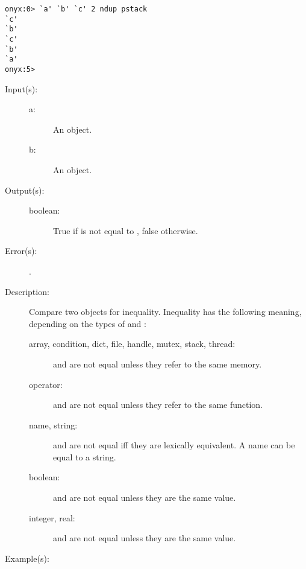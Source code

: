 \begin{description}
\begin{description}
\begin{verbatim}
onyx:0> `a' `b' `c' 2 ndup pstack
`c'
`b'
`c'
`b'
`a'
onyx:5>
		\end{verbatim}
	\end{description}
\label{systemdict:ne}
\item[{\onyxop{a b}{ne}{boolean}}: ]
	\begin{description}\item[]
	\item[Input(s): ]
		\begin{description}\item[]
		\item[a: ]
			An object.
		\item[b: ]
			An object.
		\end{description}
	\item[Output(s): ]
		\begin{description}\item[]
		\item[boolean: ]
			True if  is not equal to , false
			otherwise.
		\end{description}
	\item[Error(s): ]
		\begin{description}\item[]
		\item[.]
		\end{description}
	\item[Description: ]
		Compare two objects for inequality.  Inequality has the
		following meaning, depending on the types of  and
		:
		\begin{description}
		\item[array, condition, dict, file, handle, mutex, stack,
		thread: ]  and  are not equal unless they
		refer to the same memory.
		\item[operator: ]  and  are not equal unless
		they refer to the same function.
		\item[name, string: ]  and  are not equal iff
		they are lexically equivalent.  A name can be equal to a string.
		\item[boolean: ]  and  are not equal unless
		they are the same value.
		\item[integer, real: ]  and  are not equal
		unless they are the same value.
		\end{description}
	\item[Example(s): ]\begin{verbatim}


\end{verbatim}
\end{description}
\end{description}
